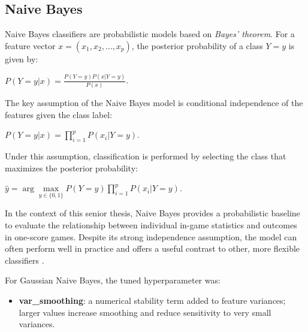 \documentclass[11pt]{amsart}
\theoremstyle{definition}                  %
\theoremstyle{remark}                       %
\numberwithin{equation}{section}
\begin{document}
\subsection{Naive Bayes}
Naive Bayes classifiers are probabilistic models based on \textit{Bayes’ theorem}. For a feature vector $x = (x_1, x_2, \dots, x_p)$, the posterior probability of a class $Y = y$ is given by: 
\begin{center}
    $P(Y = y | x) = \frac{P(Y = y) P(x | Y = y)}{P(x)}$.
\end{center}
The key assumption of the Naive Bayes model is conditional independence of the features given the class label:
\begin{center}
    $P(Y = y | x) = \prod\limits_{i=1}^p P(x_i | Y = y)$.
\end{center}
Under this assumption, classification is performed by selecting the class that maximizes the posterior probability:
\begin{center}
    $\hat{y} = \arg \max\limits_{y \in \{0, 1\}} P(Y = y)\prod\limits_{i=1}^p P(x_i | Y = y)$.
\end{center}
In the context of this senior thesis, Naive Bayes provides a probabilistic baseline to evaluate the relationship between individual in-game statistics and outcomes in one-score games. Despite its strong independence assumption, the model can often perform well in practice and offers a useful contrast to other, more flexible classifiers \cite{bishop2006pattern}.

For Gaussian Naive Bayes, the tuned hyperparameter was:
\begin{itemize}
    \item \textbf{var\_smoothing}: a numerical stability term added to feature variances; larger values increase smoothing and reduce sensitivity to very small variances.
\end{itemize}
\end{document}
